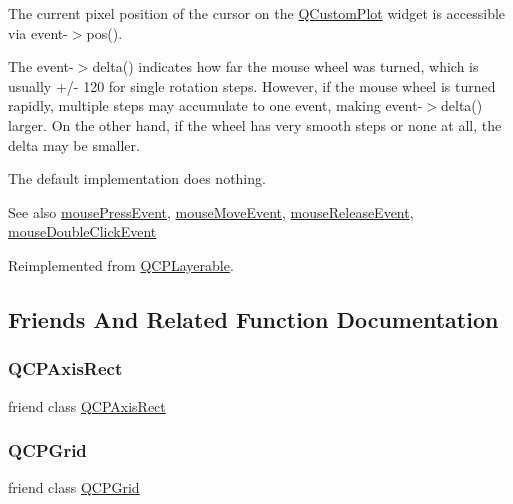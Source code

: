 The current pixel position of the cursor on the \mbox{\hyperlink{class_q_custom_plot}{Q\+Custom\+Plot}} widget is accessible via {\ttfamily event-\/$>$pos()}.

The {\ttfamily event-\/$>$delta()} indicates how far the mouse wheel was turned, which is usually +/-\/ 120 for single rotation steps. However, if the mouse wheel is turned rapidly, multiple steps may accumulate to one event, making {\ttfamily event-\/$>$delta()} larger. On the other hand, if the wheel has very smooth steps or none at all, the delta may be smaller.

The default implementation does nothing.

\begin{DoxySeeAlso}{See also}
\mbox{\hyperlink{class_q_c_p_axis_a61bc07cda6193a3fa6b5aa198fc4e4fa}{mouse\+Press\+Event}}, \mbox{\hyperlink{class_q_c_p_axis_ac5a269609e6177737faabdc46434d8c7}{mouse\+Move\+Event}}, \mbox{\hyperlink{class_q_c_p_axis_a780bee321fc6476e5fc49c4980291a01}{mouse\+Release\+Event}}, \mbox{\hyperlink{class_q_c_p_layerable_a4171e2e823aca242dd0279f00ed2de81}{mouse\+Double\+Click\+Event}} 
\end{DoxySeeAlso}


Reimplemented from \mbox{\hyperlink{class_q_c_p_layerable_a47dfd7b8fd99c08ca54e09c362b6f022}{Q\+C\+P\+Layerable}}.



\subsection{Friends And Related Function Documentation}
\mbox{\label{class_q_c_p_axis_acbf20ecb140f66c5fd1bc64ae0762990}} 
\subsubsection{\texorpdfstring{QCPAxisRect}{QCPAxisRect}}
{\footnotesize\ttfamily friend class \mbox{\hyperlink{class_q_c_p_axis_rect}{Q\+C\+P\+Axis\+Rect}}\hspace{0.3cm}{\ttfamily [friend]}}

\mbox{\label{class_q_c_p_axis_a061e177f585549fc31f780852e2bd6fe}} 
\subsubsection{\texorpdfstring{QCPGrid}{QCPGrid}}
{\footnotesize\ttfamily friend class \mbox{\hyperlink{class_q_c_p_grid}{Q\+C\+P\+Grid}}\hspace{0.3cm}{\ttfamily [friend]}}

